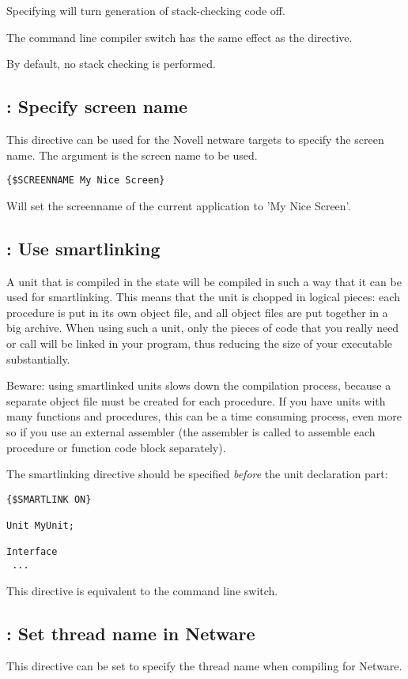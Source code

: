 Specifying  will turn generation of stack-checking code off.

The command line compiler switch  has the same effect as the
 directive.

By default, no stack checking is performed.

\subsection{ : Specify screen name}
This directive can be used for the Novell netware targets to specify the screen name. 
The argument is the screen name to be used.
\begin{verbatim}
{$SCREENNAME My Nice Screen}
\end{verbatim}
Will set the screenname of the current application to 'My Nice Screen'.

\subsection{ : Use smartlinking}

A unit that is compiled in the  state will be
compiled in such a way that it can be used for smartlinking. This means that
the unit is chopped in logical pieces: each procedure is put in its own
object file, and all object files are put together in a big archive. When
using such a unit, only the pieces of code that you really need or call
will be linked in your program, thus reducing the size of your executable
substantially.

Beware: using smartlinked units slows down the compilation process, because
a separate object file must be created for each procedure. If you have units
with many functions and procedures, this can be a time consuming process,
even more so if you use an external assembler (the assembler is called to
assemble each procedure or function code block separately).

The smartlinking directive should be specified {\em before} the unit
declaration part:
\begin{verbatim}
{$SMARTLINK ON}

Unit MyUnit;

Interface
 ...
\end{verbatim}

This directive is equivalent to the  command line switch.

\subsection{ : Set thread name in Netware}
This directive can be set to specify the thread name when compiling for
Netware. 

